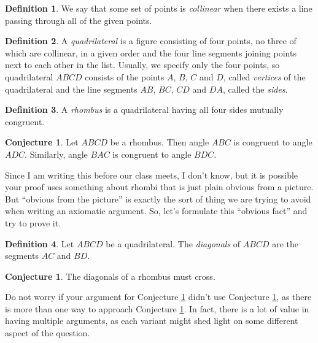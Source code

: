 \documentclass{tufte-handout}
\theoremstyle{definition}
\newtheorem{conjecture}[problem]{Conjecture}
\newtheorem*{definition}{Definition}
\begin{document}
\begin{definition}\label{defn:collinear}
We say that some set of points is \emph{collinear} when there exists a line passing through all of the given points.
\end{definition}

\begin{definition}\label{defn:quadrilateral}
A \emph{quadrilateral} is a figure consisting of four points, no three of which are collinear, in a given order and the four line segments joining points next to each other in the list. Usually, we specify only the four points, so quadrilateral $ABCD$ consists of the points $A$, $B$, $C$ and $D$, called \emph{vertices} of the quadrilateral and the line segments $AB$, $BC$, $CD$ and $DA$, called the \emph{sides}.
\end{definition}

\begin{definition}\label{defn:rhombus}
A \emph{rhombus} is a quadrilateral having all four sides mutually congruent.
\end{definition}

\begin{conjecture}\label{conj:rhombus-angles}
Let $ABCD$ be a rhombus. Then angle $ABC$ is congruent to angle $ADC$. Similarly, angle $BAC$ is congruent to angle $BDC$.
\end{conjecture}



Since I am writing this before our class meets, I don't know, but it is possible your proof uses something about rhombi that is just plain obvious from a picture. But ``obvious from the picture'' is exactly the sort of thing we are trying to avoid when writing an axiomatic argument. So, let's formulate this ``obvious fact'' and try to prove it.


\begin{definition}\label{defn:diagonals}
Let $ABCD$ be a quadrilateral. The \emph{diagonals} of $ABCD$ are the segments $AC$ and $BD$.
\end{definition}

\begin{conjecture}\label{conj:rhombus-diagonals}
The diagonals of a rhombus must cross.
\end{conjecture}



Do not worry if your argument for Conjecture \ref{conj:rhombus-angles} didn't use Conjecture \ref{conj:rhombus-diagonals}, as there is more than one way to approach Conjecture \ref{conj:rhombus-angles}. In fact, there is a lot of value in having multiple arguments, as each variant might shed light on some different aspect of the question. 
\end{document}
